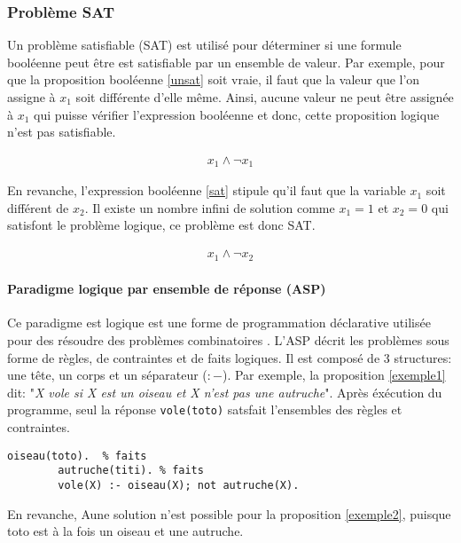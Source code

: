 \documentclass[../main.tex]{subfiles}
\begin{document}
\subsubsection{Problème SAT}
Un problème satisfiable (SAT) est utilisé pour déterminer si une formule booléenne peut être est satisfiable par un ensemble de valeur. Par exemple, pour que la proposition booléenne \ref{unsat} soit vraie, il faut que la valeur que l'on assigne à $x_1$ soit différente d'elle même. Ainsi, aucune valeur ne peut être assignée à $x_1$ qui puisse vérifier l'expression booléenne et donc, cette proposition logique n'est pas satisfiable. 


\begin{align}
\label{unsat}
    x_1 \land \neg x_1
\end{align}

En revanche, l'expression booléenne \ref{sat} stipule qu'il faut que la variable $x_1$ soit différent de $x_2$. Il existe un nombre infini de solution comme $x_1 = 1$ et $x_2 = 0$ qui satisfont le problème logique, ce problème est donc SAT.

\begin{align}
\label{sat}
    x_1 \land \neg x_2
\end{align}


\paragraph*{Paradigme logique par ensemble de réponse (ASP)}
Ce paradigme est logique est une forme de programmation déclarative utilisée pour des résoudre des problèmes combinatoires \citep{Lifschitz2008}. L'ASP décrit les problèmes sous forme de règles, de contraintes et de faits logiques. Il est composé de 3 structures: une tête, un corps et un séparateur ($:-$). Par exemple, la proposition \ref{exemple1} dit: "\textit{X vole si X est un oiseau et X n'est pas une autruche}". Après éxécution du programme, seul la réponse \texttt{vole(toto)} satsfait l'ensembles des règles et contraintes.

\begin{lstlisting}[mathescape=True,label={exemple1},caption={Code ASP permettant de calculer le scope métabolique},captionpos=b]
    	oiseau(toto).  % faits
    	autruche(titi). % faits
    	vole(X) :- oiseau(X); not autruche(X).
\end{lstlisting}

En revanche, Aune solution n'est possible pour la proposition \ref{exemple2}, puisque toto est à la fois un oiseau et une autruche.
\end{document}
